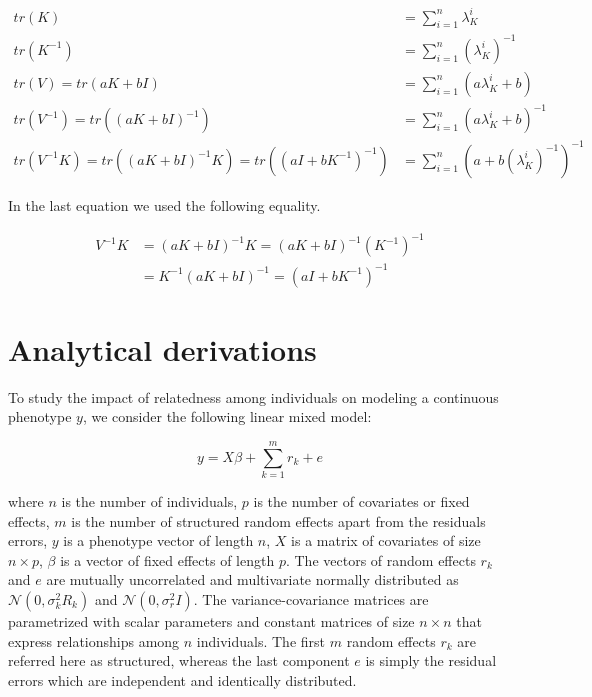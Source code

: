 \documentclass[]{book}
\theoremstyle{definition}
\theoremstyle{definition}
\theoremstyle{definition}
\theoremstyle{remark}
\begin{document}
\begin{equation} 
\begin{split}
tr(K) & = \sum_{i=1}^{n}{\lambda_{K}^i} \\
tr(K^{-1}) & = \sum_{i=1}^{n}{(\lambda_{K}^i)^{-1}} \\
tr(V) = tr(a K + b I) & = \sum_{i=1}^{n}{(a \lambda_{K}^i + b)} \\
tr(V^{-1}) = tr((a K + b I)^{-1}) & = \sum_{i=1}^{n}{(a \lambda_{K}^i + b)^{-1}} \\
tr(V^{-1} K) = tr((a K + b I)^{-1} K) = tr((a I + b K^{-1})^{-1}) & = \sum_{i=1}^{n}{(a + b (\lambda_{K}^i)^{-1})^{-1}}
\end{split}
\label{eq:evdtr}
\end{equation}

In the last equation we used the following equality.

\begin{equation} 
\begin{split}
V^{-1} K & = (a K + b I)^{-1} K = (a K + b I)^{-1} (K^{-1})^{-1} \\
 & = K^{-1} (a K + b I)^{-1} = (a I + b K^{-1})^{-1}
\end{split}
\label{eq:vinv}
\end{equation}

\section{Analytical derivations}\label{derivations}

To study the impact of relatedness among individuals on modeling a
continuous phenotype \(y\), we consider the following linear mixed
model:

\begin{equation} 
  y = X \beta + \sum_{k=1}^{m}{r_k} + e
\label{eq:lmm}
\end{equation}

where \(n\) is the number of individuals, \(p\) is the number of
covariates or fixed effects, \(m\) is the number of structured random
effects apart from the residuals errors, \(y\) is a phenotype vector of
length \(n\), \(X\) is a matrix of covariates of size \(n \times p\),
\(\beta\) is a vector of fixed effects of length \(p\). The vectors of
random effects \(r_k\) and \(e\) are mutually uncorrelated and
multivariate normally distributed as \(\mathcal{N}(0, \sigma^2_k R_k)\)
and \(\mathcal{N}(0, \sigma^2_r I)\). The variance-covariance matrices
are parametrized with scalar parameters and constant matrices of size
\(n \times n\) that express relationships among \(n\) individuals. The
first \(m\) random effects \(r_k\) are referred here as structured,
whereas the last component \(e\) is simply the residual errors which are
independent and identically distributed.
\end{document}

